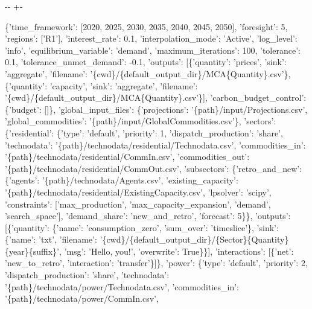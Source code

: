 \documentclass[letterpaper,10pt,english]{sphinxmanual}
\newlength\nbsphinxcodecellspacing
\begin{document}
{

\kern-\sphinxverbatimsmallskipamount\kern-\baselineskip
\kern+\FrameHeightAdjust\kern-\fboxrule
\vspace{\nbsphinxcodecellspacing}

\begin{sphinxVerbatim}[commandchars=\\\{\}]
\llap{\color{nbsphinxout}[7]:\,\hspace{\fboxrule}\hspace{\fboxsep}}\{'time\_framework': [2020, 2025, 2030, 2035, 2040, 2045, 2050],
 'foresight': 5,
 'regions': ['R1'],
 'interest\_rate': 0.1,
 'interpolation\_mode': 'Active',
 'log\_level': 'info',
 'equilibrium\_variable': 'demand',
 'maximum\_iterations': 100,
 'tolerance': 0.1,
 'tolerance\_unmet\_demand': -0.1,
 'outputs': [\{'quantity': 'prices',
   'sink': 'aggregate',
   'filename': '\{cwd\}/\{default\_output\_dir\}/MCA\{Quantity\}.csv'\},
  \{'quantity': 'capacity',
   'sink': 'aggregate',
   'filename': '\{cwd\}/\{default\_output\_dir\}/MCA\{Quantity\}.csv'\}],
 'carbon\_budget\_control': \{'budget': []\},
 'global\_input\_files': \{'projections': '\{path\}/input/Projections.csv',
  'global\_commodities': '\{path\}/input/GlobalCommodities.csv'\},
 'sectors': \{'residential': \{'type': 'default',
   'priority': 1,
   'dispatch\_production': 'share',
   'technodata': '\{path\}/technodata/residential/Technodata.csv',
   'commodities\_in': '\{path\}/technodata/residential/CommIn.csv',
   'commodities\_out': '\{path\}/technodata/residential/CommOut.csv',
   'subsectors': \{'retro\_and\_new': \{'agents': '\{path\}/technodata/Agents.csv',
     'existing\_capacity': '\{path\}/technodata/residential/ExistingCapacity.csv',
     'lpsolver': 'scipy',
     'constraints': ['max\_production',
      'max\_capacity\_expansion',
      'demand',
      'search\_space'],
     'demand\_share': 'new\_and\_retro',
     'forecast': 5\}\},
   'outputs': [\{'quantity': \{'name': 'consumption\_zero',
      'sum\_over': 'timeslice'\},
     'sink': \{'name': 'txt',
      'filename': '\{cwd\}/\{default\_output\_dir\}/\{Sector\}\{Quantity\}\{year\}\{suffix\}',
      'msg': 'Hello, you!',
      'overwrite': True\}\}],
   'interactions': [\{'net': 'new\_to\_retro', 'interaction': 'transfer'\}]\},
  'power': \{'type': 'default',
   'priority': 2,
   'dispatch\_production': 'share',
   'technodata': '\{path\}/technodata/power/Technodata.csv',
   'commodities\_in': '\{path\}/technodata/power/CommIn.csv',

\end{sphinxVerbatim}}
\end{document}
